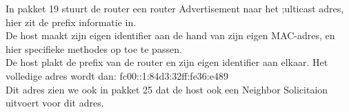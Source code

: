 In pakket 19 stuurt de router een router Advertisement naar het ;ulticast adres, hier zit de prefix informatie in.\\

De host maakt zijn eigen identifier aan de hand van zijn eigen MAC-adres, en hier specifieke methodes op toe te passen.\\

De host plakt de prefix van de router en zijn eigen identifier aan elkaar. Het volledige adres wordt dan: fc00::1:84d3:32ff:fe36:e489\\

Dit adres zien we ook in pakket 25 dat de host ook een Neighbor Solicitaion uitvoert voor dit adres.